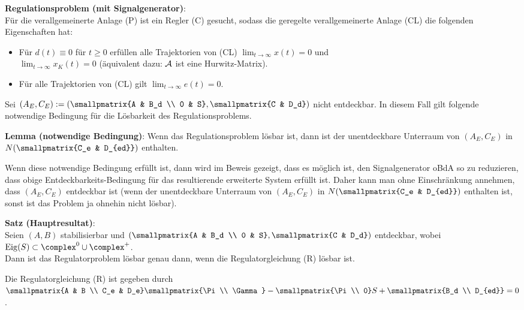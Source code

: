 \textbf{Regulationsproblem (mit Signalgenerator)}:\\
Für die verallgemeinerte Anlage (P) ist ein Regler (C) gesucht, sodass die geregelte
verallgemeinerte Anlage (CL) die folgenden Eigenschaften hat:
\begin{itemize}
    \item
    Für $d(t) \equiv 0$ für $t \ge 0$ erfüllen alle Trajektorien von (CL)
    $\lim_{t \to \infty} x(t) = 0$ und\\
    $\lim_{t \to \infty} x_K(t) = 0$
    (äquivalent dazu: $\mathcal{A}$ ist eine Hurwitz-Matrix).

    \item
    Für alle Trajektorien von (CL) gilt $\lim_{t \to \infty} e(t) = 0$.
\end{itemize}

\linie

Sei $(A_E, C_E) := \left(\smallpmatrix{A & B_d \\ 0 & S}, \smallpmatrix{C & D_d}\right)$
nicht entdeckbar.
In diesem Fall gilt folgende notwendige Bedingung für die Lösbarkeit des Regulationsproblems.

\textbf{Lemma (notwendige Bedingung)}:
Wenn das Regulationsproblem lösbar ist, dann ist der unentdeckbare Unterraum von
$(A_E, C_E)$ in $N(\smallpmatrix{C_e & D_{ed}})$ enthalten.

Wenn diese notwendige Bedingung erfüllt ist, dann wird im Beweis gezeigt, dass es möglich ist,
den Signalgenerator oBdA so zu reduzieren, dass obige Entdeckbarkeits-Bedingung für das
resultierende erweiterte System erfüllt ist.
Daher kann man ohne Einschränkung annehmen, dass $(A_E, C_E)$ entdeckbar ist
(wenn der unentdeckbare Unterraum von
$(A_E, C_E)$ in $N(\smallpmatrix{C_e & D_{ed}})$ enthalten ist,
sonst ist das Problem ja ohnehin nicht lösbar).

\linie

\textbf{Satz (Hauptresultat)}:\\
Seien $(A, B)$ stabilisierbar und
$\left(\smallpmatrix{A & B_d \\ 0 & S}, \smallpmatrix{C & D_d}\right)$ entdeckbar,
wobei $\Eig(S) \subset \complex^0 \cup \complex^+$.\\
Dann ist das Regulatorproblem lösbar genau dann, wenn die Regulatorgleichung (R) lösbar ist.

Die Regulatorgleichung (R) ist gegeben durch
$\smallpmatrix{A & B \\ C_e & D_e} \smallpmatrix{\Pi \\ \Gamma} -
\smallpmatrix{\Pi \\ 0} S + \smallpmatrix{B_d \\ D_{ed}} = 0$.

